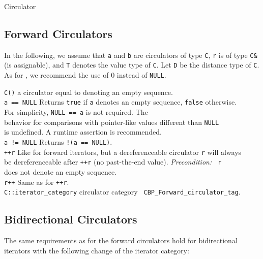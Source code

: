 \begin{ccRefConcept}{Circulator}
\subsection*{Forward Circulators}

In the following, we assume that {\tt a} and {\tt b} are circulators
of type {\tt C}, {\tt r} is of type {\tt C\&} (is assignable), and
{\tt T} denotes the value type of {\tt C}.  Let {\tt D} be the
distance type of {\tt C}.  As for \CC, we recommend the use of 0
instead of {\tt NULL}.

\begin{tabbing}
    {\tt C()}         \> a circulator equal to  denoting an 
                         empty sequence.\\
    {\tt a == NULL}   \> Returns {\tt true} if {\tt a} denotes an empty
                         sequence, {\tt false} otherwise. \\
                      \> For simplicity, {\tt NULL == a} is not required. The\\
                      \> behavior for comparisons with pointer-like 
                         values different than {\tt NULL} \\
                      \> is undefined. A runtime assertion is 
                         recommended.\\
    {\tt a != NULL}   \> Returns {\tt !(a == NULL)}. \\
    {\tt ++r}         \> Like for forward iterators, but a dereferenceable
                         circulator {\tt r} will always\\
                      \> be dereferenceable after {\tt ++r} (no
                         past-the-end value). {\em Precondition:} {\tt
                           r} \\
                      \> does not denote an empty sequence.\\
    {\tt r++}         \> Same as for {\tt ++r}.\\
    {\tt C::iterator\_category} \>  circulator category {\tt 
                                      CBP\_Forward\_circulator\_tag}.
\end{tabbing}

\subsection*{Bidirectional Circulators}

The same requirements as for the forward circulators hold for
bidirectional iterators with the following change of the iterator
category:


\end{ccRefConcept}
